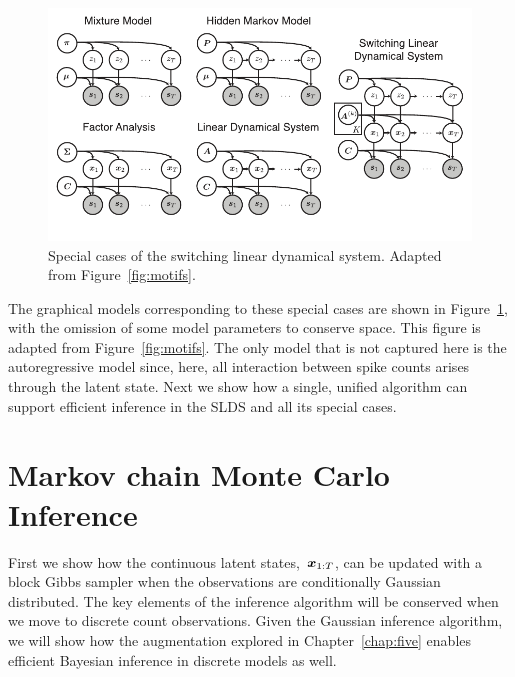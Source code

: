 \begin{figure}[t]
  \centering%
\includegraphics[width=5.5in]{figures/ch8/graphical_models} 
\vspace{-.25in}
\caption{Special cases of the switching linear dynamical system.
  Adapted from Figure~\ref{fig:motifs}.}
\label{fig:slds_models}
\end{figure}

The graphical models corresponding to these special cases are shown in
Figure~\ref{fig:slds_models}, with the omission of some model
parameters to conserve space. This figure is adapted from
Figure~\ref{fig:motifs}. The only model that is not captured here
is the autoregressive model since, here, all interaction between
spike counts arises through the latent state. Next we show how
a single, unified algorithm can support efficient
inference in the SLDS and all its special cases.


\section{Markov chain Monte Carlo Inference}


First we show how the continuous latent states,~$\boldsymbol{x}_{1:T}$, can be
updated with a block Gibbs sampler when the observations are conditionally
Gaussian distributed.  The
key elements of the inference algorithm will be conserved when we move
to discrete count observations.  Given the Gaussian inference
algorithm, we will show how the \polyagamma augmentation explored in
Chapter~\ref{chap:five} enables efficient Bayesian
inference in discrete models as well.

